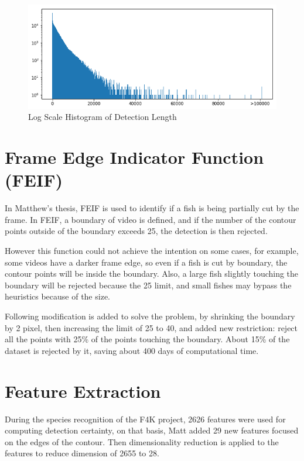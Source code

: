 \documentclass[bsc,logo,twoside,fullspacing,parskip]{infthesis}
\begin{document}
\begin{figure}
\centering
    \includegraphics[scale=0.65]{graph/frame_distribution.png}
    \caption{Log Scale Histogram of Detection Length}
    \label{fig:vidlength}
\end{figure}

\section{Frame Edge Indicator Function (FEIF)}

In Matthew's thesis, FEIF is used to identify if a fish is being partially cut by the frame. In FEIF, a boundary of video is defined, and if the number of the contour points outside of the boundary exceeds 25, the detection is then rejected.

However this function could not achieve the intention on some cases, for example, some videos have a darker frame edge, so even if a fish is cut by boundary, the contour points will be inside the boundary. Also, a large fish slightly touching the boundary will be rejected because the 25 limit, and small fishes may bypass the heuristics because of the size.

Following modification is added to solve the problem, by shrinking the boundary by 2 pixel, then increasing the limit of 25 to 40, and added new restriction: reject all the points with 25\% of the points touching the boundary. About 15\% of the dataset is rejected by it, saving about 400 days of computational time.

\section{Feature Extraction}

During the species recognition of the F4K project, 2626 features were used for computing detection certainty, on that basis, Matt added 29 new features focused on the edges of the contour. Then dimensionality reduction is applied to the features to reduce dimension of 2655 to 28. 
\end{document}
